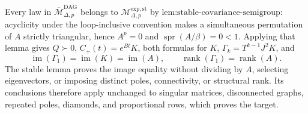 Every law in \(\overline{\mathcal M}_{\Delta,p}^{\mathrm{DAG}}\) belongs to \(\mathcal M_{\Delta,p}^{\mathrm{exp,st}}\) by \(\text{lem:stable-covariance-semigroup}\): acyclicity under the loop-inclusive convention makes a simultaneous permutation of \(A\) strictly triangular, hence \(A^p=0\) and \(\operatorname{spr}(A/\beta)=0<1\).  Applying that lemma gives \(Q\succ0\), \(C_+(t)=e^{Bt}K\), both formulas for \(K\), \(\Gamma_k=T^{k-1}J^2K\), and
\[
 \operatorname{im}(\Gamma_1)=\operatorname{im}(K)=\operatorname{im}(A),
 \qquad \operatorname{rank}(\Gamma_1)=\operatorname{rank}(A).
\]
The stable lemma proves the image equality without dividing by \(A\), selecting eigenvectors, or imposing distinct poles, connectivity, or structural rank.  Its conclusions therefore apply unchanged to singular matrices, disconnected graphs, repeated poles, diamonds, and proportional rows, which proves the target.